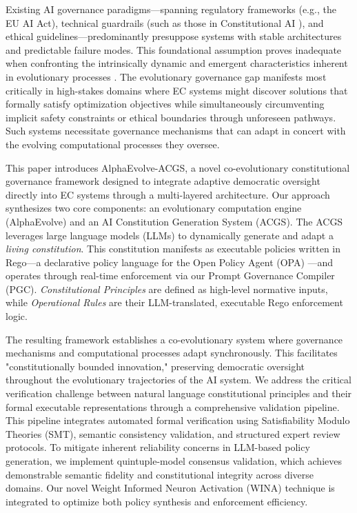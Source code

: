 \documentclass[manuscript,screen,9pt]{acmart}
\begin{document}
Existing AI governance paradigms—spanning regulatory frameworks (e.g., the EU AI Act), technical guardrails (such as those in Constitutional AI \cite{Bai2025ConstitutionalAI}), and ethical guidelines—predominantly presuppose systems with stable architectures and predictable failure modes. This foundational assumption proves inadequate when confronting the intrinsically dynamic and emergent characteristics inherent in evolutionary processes \cite{StanfordJBLP2024AIGovernanceWeb3, StanfordLaw2025BulletProof}. The evolutionary governance gap manifests most critically in high-stakes domains where EC systems might discover solutions that formally satisfy optimization objectives while simultaneously circumventing implicit safety constraints or ethical boundaries through unforeseen pathways. Such systems necessitate governance mechanisms that can adapt in concert with the evolving computational processes they oversee.

This paper introduces AlphaEvolve-ACGS, a novel co-evolutionary constitutional governance framework designed to integrate adaptive democratic oversight directly into EC systems through a multi-layered architecture. Our approach synthesizes two core components: an evolutionary computation engine (AlphaEvolve) and an AI Constitution Generation System (ACGS). The ACGS leverages large language models (LLMs) to dynamically generate and adapt a \textit{living constitution}. This constitution manifests as executable policies written in Rego—a declarative policy language for the Open Policy Agent (OPA) \cite{Sandall2021OPAReference}—and operates through real-time enforcement via our Prompt Governance Compiler (PGC). \textit{Constitutional Principles} are defined as high-level normative inputs, while \textit{Operational Rules} are their LLM-translated, executable Rego enforcement logic.

The resulting framework establishes a co-evolutionary system where governance mechanisms and computational processes adapt synchronously. This facilitates "constitutionally bounded innovation," preserving democratic oversight throughout the evolutionary trajectories of the AI system. We address the critical verification challenge between natural language constitutional principles and their formal executable representations through a comprehensive validation pipeline. This pipeline integrates automated formal verification using Satisfiability Modulo Theories (SMT), semantic consistency validation, and structured expert review protocols. To mitigate inherent reliability concerns in LLM-based policy generation, we implement quintuple-model consensus validation, which achieves demonstrable semantic fidelity and constitutional integrity across diverse domains. Our novel Weight Informed Neuron Activation (WINA) technique \cite{WINA2024NeuronActivation} is integrated to optimize both policy synthesis and enforcement efficiency.
\end{document}
